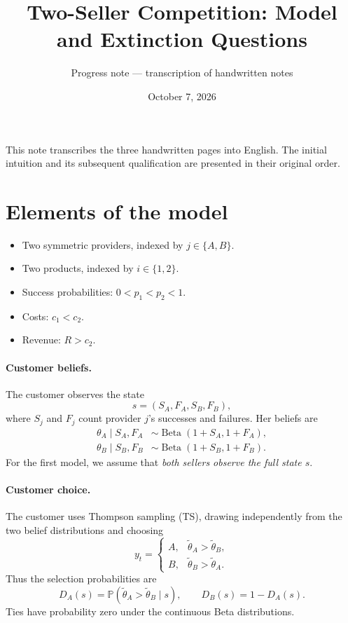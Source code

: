 \documentclass[11pt]{article}
\title{Two-Seller Competition: Model and Extinction Questions}
\author{Progress note --- transcription of handwritten notes}
\date{October 7, 2026}
\newcommand{\Pb}{\mathbb P}
\DeclareMathOperator{\Beta}{Beta}
\begin{document}
\maketitle

This note transcribes the three handwritten pages into English. The initial
intuition and its subsequent qualification are presented in their original
order.

\section{Elements of the model}

\begin{itemize}
\item Two symmetric providers, indexed by $j\in\{A,B\}$.
\item Two products, indexed by $i\in\{1,2\}$.
\item Success probabilities: $0<p_1<p_2<1$.
\item Costs: $c_1<c_2$.
\item Revenue: $R>c_2$.
\end{itemize}

\paragraph{Customer beliefs.}
The customer observes the state
\[
s=(S_A,F_A,S_B,F_B),
\]
where $S_j$ and $F_j$ count provider $j$'s successes and failures. Her
beliefs are
\begin{align}
\theta_A\mid S_A,F_A&\sim\Beta(1+S_A,1+F_A),\\
\theta_B\mid S_B,F_B&\sim\Beta(1+S_B,1+F_B).
\end{align}
For the first model, we assume that \emph{both sellers observe the full
state $s$}.

\paragraph{Customer choice.}
The customer uses Thompson sampling (TS), drawing independently from the
two belief distributions and choosing
\begin{equation}
y_t=
\begin{cases}
A,&\widetilde\theta_A>\widetilde\theta_B,\\
B,&\widetilde\theta_B>\widetilde\theta_A.
\end{cases}
\end{equation}
Thus the selection probabilities are
\begin{equation}
D_A(s)=\Pb(\widetilde\theta_A>\widetilde\theta_B\mid s),
\qquad D_B(s)=1-D_A(s).
\end{equation}
Ties have probability zero under the continuous Beta distributions.
\end{document}

